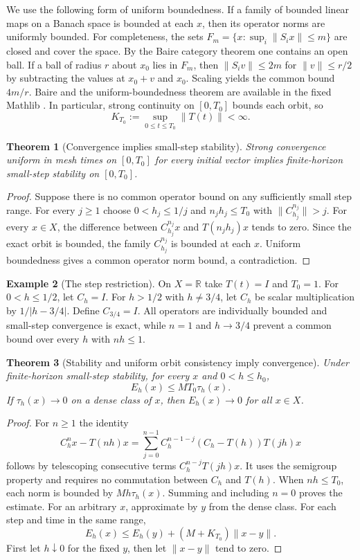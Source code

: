 \documentclass[11pt,oneside,openany]{book}
\theoremstyle{plain}
\newtheorem{theorem}{Theorem}[chapter]
\theoremstyle{definition}
\newtheorem{example}[theorem]{Example}
\theoremstyle{remark}
\begin{document}
We use the following form of uniform boundedness. If a family of
bounded linear maps on a Banach space is bounded at each \(x\),
then its operator norms are uniformly bounded. For completeness,
the sets \(F_m=\{x:\sup_i\|S_i x\|\le m\}\) are closed and cover
the space. By the Baire category theorem one contains an open
ball. If a ball of radius \(r\) about \(x_0\) lies in \(F_m\),
then \(\|S_i v\|\le2m\) for \(\|v\|\le r/2\) by subtracting
the values at \(x_0+v\) and \(x_0\). Scaling yields the common
bound \(4m/r\). Baire and the uniform-boundedness theorem are
available in the fixed Mathlib \cite{mathlib}.
In particular, strong continuity on \([0,T_0]\) bounds each
orbit, so
\[
                   K_{T_0}:=\sup_{0\le t\le T_0}\|T(t)\|<\infty.
\]

\begin{theorem}[Convergence implies small-step stability]
\label{p206:W18}
Strong convergence uniform in mesh times on \([0,T_0]\) for
every initial vector implies finite-horizon small-step stability
on \([0,T_0]\).
\end{theorem}
\begin{proof}
Suppose there is no common operator bound on any sufficiently
small step range. For every \(j\ge1\) choose \(0<h_j\le 1/j\)
and \(n_jh_j\le T_0\) with \(\|C_{h_j}^{n_j}\|>j\).
For every \(x\in X\), the difference between \(C_{h_j}^{n_j}x\)
and \(T(n_jh_j)x\) tends to zero. Since the exact orbit is bounded,
the family \(C_{h_j}^{n_j}\) is bounded at each \(x\).
Uniform boundedness gives a common operator norm bound, a
contradiction.
\end{proof}

\begin{example}[The step restriction]
On \(X=\mathbb R\) take \(T(t)=I\) and \(T_0=1\).
For \(0<h\le1/2\), let \(C_h=I\). For \(h>1/2\) with
\(h\ne3/4\), let \(C_h\) be scalar multiplication by
\(1/|h-3/4|\). Define \(C_{3/4}=I\).
All operators are individually bounded and small-step convergence
is exact, while \(n=1\) and \(h\to3/4\) prevent a common bound
over every \(h\) with \(nh\le1\).
\end{example}

\begin{theorem}[Stability and uniform orbit consistency imply convergence]
\label{p206:W19}
Under finite-horizon small-step stability, for every \(x\)
and \(0<h\le h_0\),
\[
               E_h(x)\le MT_0\tau_h(x).
\]
If \(\tau_h(x)\to0\) on a dense class of \(x\), then
\(E_h(x)\to0\) for all \(x\in X\).
\end{theorem}
\begin{proof}
For \(n\ge1\) the identity
\[
 C_h^nx-T(nh)x
     =\sum_{j=0}^{n-1}C_h^{n-1-j}(C_h-T(h))T(jh)x
\]
follows by telescoping consecutive terms
\(C_h^{n-j}T(jh)x\). It uses the semigroup property and requires
no commutation between \(C_h\) and \(T(h)\).
When \(nh\le T_0\), each norm is bounded by \(Mh\tau_h(x)\).
Summing and including \(n=0\) proves the estimate.
For an arbitrary \(x\), approximate by \(y\) from the dense
class. For each step and time in the same range,
\[
  E_h(x)\le E_h(y)+(M+K_{T_0})\|x-y\|.
\]
First let \(h\downarrow0\) for the fixed \(y\), then
let \(\|x-y\|\) tend to zero.
\end{proof}
\end{document}
